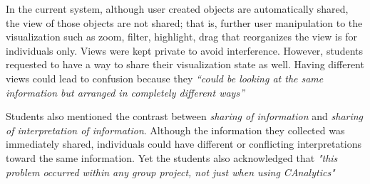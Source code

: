 In the current system, although user created objects are automatically shared, the view of those objects are not shared; that is, further user manipulation to the visualization such as zoom, filter, highlight, drag that reorganizes the view is for individuals only. Views were kept private to avoid interference. However, students requested to have a way to share their visualization state as well. Having different views could lead to confusion because they \textit{``could be looking at the same information but arranged in completely different ways''}

Students also mentioned the contrast between \emph{sharing of information} and \emph{sharing of interpretation of information}. Although the information they collected was immediately shared, individuals could have different or conflicting interpretations toward the same information. Yet the students also acknowledged that \textit{"this problem occurred within any group project, not just when using CAnalytics"}